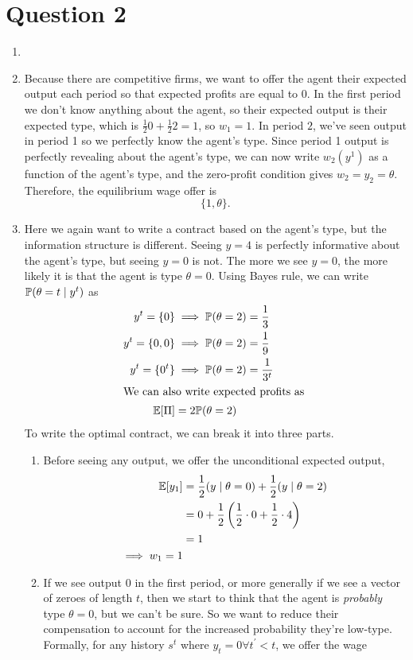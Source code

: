 \section{Question 2}
\begin{enumerate}[label=\alph*)]
\item {}
\item Because there are competitive firms, we want to offer the agent their expected output each period so that expected profits are equal to $0$. In the first period we don't know anything about the agent, so their expected output is their expected type, which is $\frac{1}{2} 0 + \frac{1}{2} 2 = 1$, so $w_1 = 1$. In period $2$, we've seen output in period 1 so we perfectly know the agent's type. Since period 1 output is perfectly revealing about the agent's type, we can now write $w_2(y^1)$ as a function of the agent's type, and the zero-profit condition gives $w_2 = y_2 = \theta$. Therefore, the equilibrium wage offer is
  \[
\{1, \theta\}.
  \]
\item Here we again want to write a contract based on the agent's type, but the information structure is different. Seeing $y = 4$ is perfectly informative about the agent's type, but seeing $y = 0$ is not. The more we see $y = 0$, the more likely it is that the agent is type $\theta = 0$. Using Bayes rule, we can write $\mathbb{P}(\theta = t \mid y^t)$ as
  \begin{align*}
    y^t = \{0\} &\implies \mathbb{P}(\theta = 2) = \frac{1}{3}\\
    y^t = \{0, 0\} &\implies \mathbb{P}(\theta = 2) = \frac{1}{9}\\
    y^t = \{0^t\} &\implies \mathbb{P}(\theta = 2) = \frac{1}{3^t}\\
    \intertext{We can also write expected profits as }
    \mathbb{E}[\Pi] &= 2 \mathbb{P} (\theta = 2)
  \end{align*}
  To write the optimal contract, we can break it into three parts.
\begin{enumerate}
  \item
  Before seeing any output, we offer the unconditional expected output,
  \begin{align*}
    \mathbb{E}[y_1] &= \frac{1}{2}(y \mid \theta = 0) + \frac{1}{2} (y \mid \theta = 2)\\
            &= 0 + \frac{1}{2} \left(\frac{1}{2} \cdot 0 + \frac{1}{2} \cdot 4\right)\\
            &= 1\\
    \implies w_1 = 1
  \end{align*}
\item If we see output $0$ in the first period, or more generally if we see a vector of zeroes of length $t$, then we start to think that the agent is \emph{probably} type $\theta = 0$, but we can't be sure. So we want to reduce their compensation to account for the increased probability they're low-type. Formally, for any history $s^t$ where $y_t = 0 \forall  t^\prime < t$, we offer the wage

\end{enumerate}
\end{enumerate}
